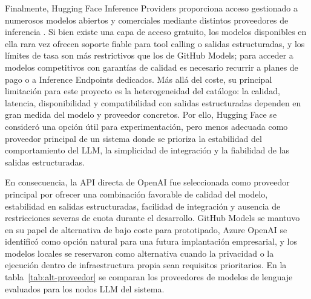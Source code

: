 \documentclass[12pt,a4paper]{article}
\theoremstyle{plain}
\begin{document}
Finalmente, Hugging Face Inference Providers proporciona acceso gestionado a numerosos modelos abiertos y comerciales mediante distintos proveedores de inferencia \cite{huggingface_inference_providers}. Si bien existe una capa de acceso gratuito, los modelos disponibles en ella rara vez ofrecen soporte fiable para tool calling o salidas estructuradas, y los límites de tasa son más restrictivos que los de GitHub Models; para acceder a modelos competitivos con garantías de calidad es necesario recurrir a planes de pago o a Inference Endpoints dedicados. Más allá del coste, su principal limitación para este proyecto es la heterogeneidad del catálogo: la calidad, latencia, disponibilidad y compatibilidad con salidas estructuradas dependen en gran medida del modelo y proveedor concretos. Por ello, Hugging Face se consideró una opción útil para experimentación, pero menos adecuada como proveedor principal de un sistema donde se prioriza la estabilidad del comportamiento del LLM, la simplicidad de integración y la fiabilidad de las salidas estructuradas.

En consecuencia, la API directa de OpenAI fue seleccionada como proveedor principal por ofrecer una combinación favorable de calidad del modelo, estabilidad en salidas estructuradas, facilidad de integración y ausencia de restricciones severas de cuota durante el desarrollo. GitHub Models se mantuvo en su papel de alternativa de bajo coste para prototipado, Azure OpenAI se identificó como opción natural para una futura implantación empresarial, y los modelos locales se reservaron como alternativa cuando la privacidad o la ejecución dentro de infraestructura propia sean requisitos prioritarios. En la tabla~\ref{tab:alt-proveedor} se comparan los proveedores de modelos de lenguaje evaluados para los nodos LLM del sistema. %
\end{document}
